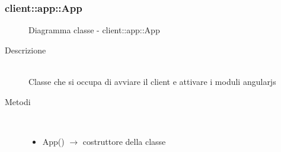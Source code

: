 \subsubsection[App]{client::app::App}
\begin{figure}[H]
	\centering
	\caption{Diagramma classe - client::app::App}
\end{figure}\begin{description}
\item[Descrizione] \hfill \\
Classe che si occupa di avviare il client e attivare i moduli angularjs
\item[Metodi] \hfill \\
\vspace{-7mm}
\begin{itemize}
	\item App() $\rightarrow$ costruttore della classe
\end{itemize}

\end{description}

\vspace{0.5cm}
\hypertarget{client::app::Configuration}{}
